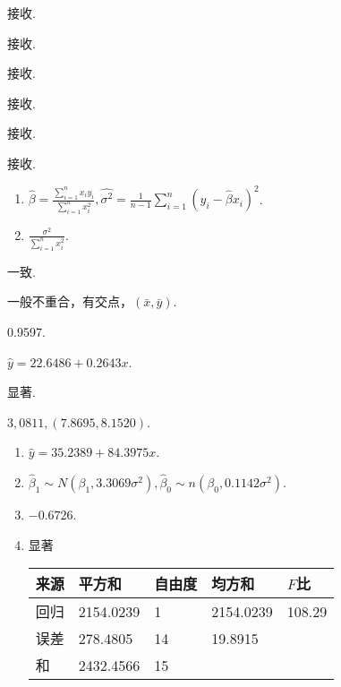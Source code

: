 \begin{answer}
    \item 接收.
    \item 接收.
    \item 接收.
    \item 接收.
    \item 接收.
    \item 接收.
\end{answer}

\begin{answer}
  \item \begin{enumerate}
    \item $\hat\beta=\frac{\sum_{i=1}^nx_iy_i}{\sum_{i=1}^nx_i^2}
      ,\hat{\sigma^2}=\frac1{n-1}\sum_{i=1}^n(y_i-\hat\beta x_i)^2$.
    \item $\frac{\sigma^2}{\sum_{i=1}^nx_i^2}$.
    \end{enumerate}
    \item 一致.
    \setcounter{enumi}{3}
    \item 一般不重合，有交点，$(\bar x,\bar y)$.
    \item \begin{enumerate*}
      \setcounter{enumii}{1}
      \item 0.9597.
      \item $\hat y =22.6486+0.2643x$.
      \item 显著.
    \end{enumerate*}
    \item $3,0811,(7.8695,8.1520)$.
    \item \begin{enumerate}
      \item $\hat y =35.2389+84.3975x$.
      \item $\hat\beta_1\sim N(\beta_1,3.3069\sigma^2),
      \hat\beta_0\sim n(\beta_0,0.1142\sigma^2)$.
      \item $-0.6726$.
      \item 显著
      \begin{center}
      \begin{tabularx}{0.7\linewidth}{ZZZZZ}
        \toprule
        来源 & 平方和 & 自由度 & 均方和 & $F$比 \\
        \midrule
        回归 & 2154.0239 & 1 & 2154.0239 & 108.29 \\
        误差 & 278.4805 & 14 & 19.8915 \\
        \midrule
        和 & 2432.4566 & 15 \\

\end{tabularx}
\end{center}
\end{enumerate}
\end{answer}
